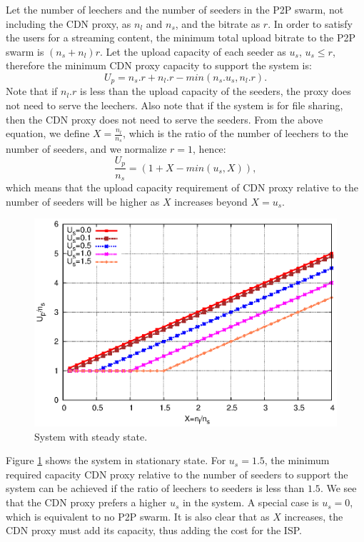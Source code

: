 \documentclass[paper]{ieice}
\begin{document}
Let the number of leechers and the number of seeders in the P2P swarm, not including the CDN proxy, as $n_l$ and $n_s$, and the bitrate as $r$.
In order to satisfy the users for a streaming content, the minimum total upload bitrate to the P2P swarm is $(n_s + n_l)r$.
Let the upload capacity of each seeder as $u_s$, $u_s \leq r$, therefore the minimum CDN proxy capacity to support the system is:
\begin{equation}
        U_p = n_s.r + n_l.r - min(n_s.u_s, n_l.r).
\end{equation}
Note that if $n_l.r$ is less than the upload capacity of the seeders, the proxy does not need to serve the leechers.
Also note that if the system is for file sharing, then the CDN proxy does not need to serve the seeders.
From the above equation, we define $X=\frac{n_l}{n_s}$, which is the ratio of the number of leechers to the number of seeders, and we normalize $r=1$, hence:
\begin{equation}
        \frac{U_p}{n_s} = (1 + X - min (u_s,X)),
\end{equation}
which means that the upload capacity requirement of CDN proxy relative to the number of seeders will be higher as $X$ increases beyond $X = u_s$.

\begin{figure}[hb] 
\begin{center}
\includegraphics[scale=0.5]{graphs/stable-steady-state.eps}
\end{center}
\caption{System with steady state.}
\label{fig:steadystate}
\vspace{-2mm}
\end{figure}

Figure \ref{fig:steadystate} shows the system in stationary state.
For $u_s=1.5$, the minimum required capacity CDN proxy relative to the number of seeders to support the system can be achieved if the ratio of leechers to seeders is less than $1.5$.
We see that the CDN proxy prefers a higher $u_s$ in the system.
A special case is $u_s = 0$, which is equivalent to no P2P swarm.
It is also clear that as $X$ increases, the CDN proxy must add its capacity, thus adding the cost for the ISP.
\end{document}
